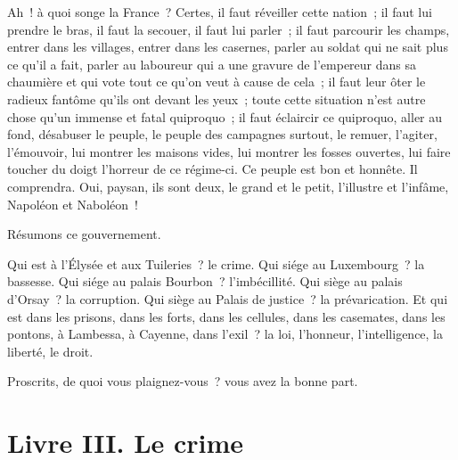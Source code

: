 \documentclass[french,twoside]{book} %
\begin{document}
Ah ! à quoi songe la France ? Certes, il faut réveiller cette nation ; il faut lui prendre le bras, il faut la secouer, il faut lui parler ; il faut parcourir les champs, entrer dans les villages, entrer dans les casernes, parler au soldat qui ne sait plus ce qu’il a fait, parler au laboureur qui a une gravure de l’empereur dans sa chaumière et qui vote tout ce qu’on veut à cause de cela ; il faut leur ôter le radieux fantôme qu’ils ont devant les yeux ; toute cette situation n’est autre chose qu’un immense et fatal quiproquo ; il faut éclaircir ce quiproquo, aller au fond, désabuser le peuple, le peuple des campagnes surtout, le remuer, l’agiter, l’émouvoir, lui montrer les maisons vides, lui montrer les fosses ouvertes, lui faire toucher du doigt l’horreur de ce régime-ci. Ce peuple est bon et honnête. Il comprendra. Oui, paysan, ils sont deux, le grand et le petit, l’illustre et l’infâme, Napoléon et Naboléon !\par
Résumons ce gouvernement.\par
Qui est à l’Élysée et aux Tuileries ? le crime. Qui siége au Luxembourg ? la bassesse. Qui siége au palais Bourbon ? l’imbécillité. Qui siège au palais d’Orsay ? la corruption. Qui siège au Palais de justice ? la prévarication. Et qui est dans les prisons, dans les forts, dans les cellules, dans les casemates, dans les pontons, à Lambessa, à Cayenne, dans l’exil ? la loi, l’honneur, l’intelligence, la liberté, le droit.\par
Proscrits, de quoi vous plaignez-vous ? vous avez la bonne part.
\section[{Livre III. Le crime}]{Livre III. Le crime}\renewcommand{\leftmark}{Livre III. Le crime}
\end{document}
